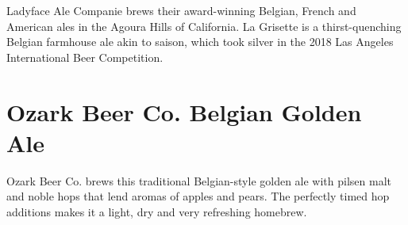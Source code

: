 \documentclass[10pt,oneside]{scrbook}
\begin{document}
\begin{aboutblock}
Ladyface Ale Companie brews their award-winning Belgian, French and American
ales in the Agoura Hills of California. La Grisette is a thirst-quenching
Belgian farmhouse ale akin to saison, which took silver in the 2018 Las Angeles
International Beer Competition.
\end{aboutblock}


\begin{methodandtiming}
 
\begin{mashsteps}
\end{mashsteps}

\end{methodandtiming}

\pagebreak

\begin{ingredientsblock}

\begin{malts}
\end{malts}

\begin{hops}
\end{hops}

\begin{yeasts}
\end{yeasts}

\end{ingredientsblock}

\chapter*{Ozark Beer Co. Belgian Golden Ale}

\begin{aboutblock}
Ozark Beer Co. brews this traditional Belgian-style golden ale with pilsen malt
and noble hops that lend aromas of apples and pears. The perfectly timed hop
additions makes it a light, dry and very refreshing homebrew.
\end{aboutblock}

\end{document}
